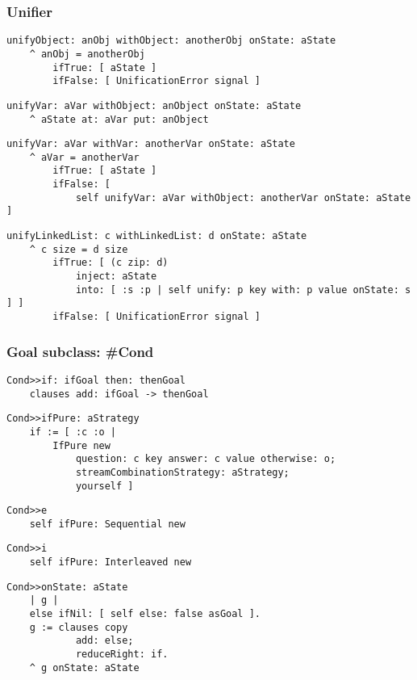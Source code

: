 \documentclass{beamer}
\begin{document}
\begin{frame}[fragile]
\frametitle{Unifier}
\begin{verbatim}
unifyObject: anObj withObject: anotherObj onState: aState
    ^ anObj = anotherObj
        ifTrue: [ aState ]
        ifFalse: [ UnificationError signal ]
\end{verbatim}
\begin{verbatim}
unifyVar: aVar withObject: anObject onState: aState
    ^ aState at: aVar put: anObject
\end{verbatim}
\begin{verbatim}
unifyVar: aVar withVar: anotherVar onState: aState
    ^ aVar = anotherVar
        ifTrue: [ aState ]
        ifFalse: [
            self unifyVar: aVar withObject: anotherVar onState: aState ]
\end{verbatim}
\begin{verbatim}
unifyLinkedList: c withLinkedList: d onState: aState
    ^ c size = d size
        ifTrue: [ (c zip: d)
            inject: aState
            into: [ :s :p | self unify: p key with: p value onState: s ] ]
        ifFalse: [ UnificationError signal ]
\end{verbatim}
\end{frame}


\begin{frame}[fragile]
\frametitle{Goal subclass: \#Cond}
\begin{verbatim}
Cond>>if: ifGoal then: thenGoal
    clauses add: ifGoal -> thenGoal
\end{verbatim}
\begin{verbatim}
Cond>>ifPure: aStrategy
    if := [ :c :o |
        IfPure new
            question: c key answer: c value otherwise: o;
            streamCombinationStrategy: aStrategy;
            yourself ]
\end{verbatim}
\begin{verbatim}
Cond>>e
    self ifPure: Sequential new
\end{verbatim}
\begin{verbatim}
Cond>>i
    self ifPure: Interleaved new
\end{verbatim}
\begin{verbatim}
Cond>>onState: aState
    | g |
    else ifNil: [ self else: false asGoal ].
    g := clauses copy
            add: else;
            reduceRight: if.
    ^ g onState: aState
\end{verbatim}
\end{frame}
\end{document}
